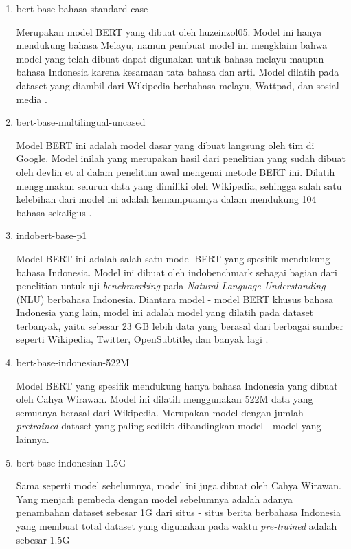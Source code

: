 \begin{enumerate}
    \item bert-base-bahasa-standard-case

          Merupakan model BERT yang dibuat oleh huzeinzol05. Model ini hanya mendukung bahasa Melayu, namun pembuat model ini mengklaim bahwa model yang telah dibuat dapat digunakan untuk bahasa melayu maupun bahasa Indonesia karena kesamaan tata bahasa dan arti. Model dilatih pada dataset yang diambil dari Wikipedia berbahasa melayu, Wattpad, dan sosial media \cite{Malaya}.

    \item bert-base-multilingual-uncased

          Model BERT ini adalah model dasar yang dibuat langsung oleh tim di Google. Model inilah yang merupakan hasil dari penelitian yang sudah dibuat oleh devlin et al dalam penelitian awal mengenai metode BERT ini. Dilatih menggunakan seluruh data yang dimiliki oleh Wikipedia, sehingga salah satu kelebihan dari model ini adalah kemampuannya dalam mendukung 104 bahasa sekaligus \cite{devlin2019bert}.

    \item indobert-base-p1

          Model BERT ini adalah salah satu model BERT yang spesifik mendukung bahasa Indonesia. Model ini dibuat oleh indobenchmark sebagai bagian dari penelitian untuk uji \textit{benchmarking} pada \textit{Natural Language Understanding} (NLU) berbahasa Indonesia. Diantara model - model BERT khusus bahasa Indonesia yang lain, model ini adalah model yang dilatih pada dataset terbanyak, yaitu sebesar 23 GB lebih data yang berasal dari berbagai sumber seperti Wikipedia, Twitter, OpenSubtitle, dan banyak lagi \cite{wilie2020indonlu}.

    \item bert-base-indonesian-522M

          Model BERT yang spesifik mendukung hanya bahasa Indonesia yang dibuat oleh Cahya Wirawan. Model ini dilatih menggunakan 522M data yang semuanya berasal dari Wikipedia. Merupakan model dengan jumlah \textit{pretrained} dataset yang paling sedikit dibandingkan model - model yang lainnya.

    \item bert-base-indonesian-1.5G

          Sama seperti model sebelumnya, model ini juga dibuat oleh Cahya Wirawan. Yang menjadi pembeda dengan model sebelumnya adalah adanya penambahan dataset sebesar 1G dari situs - situs berita berbahasa Indonesia yang membuat total dataset yang digunakan pada waktu \textit{pre-trained} adalah sebesar 1.5G

\end{enumerate}


